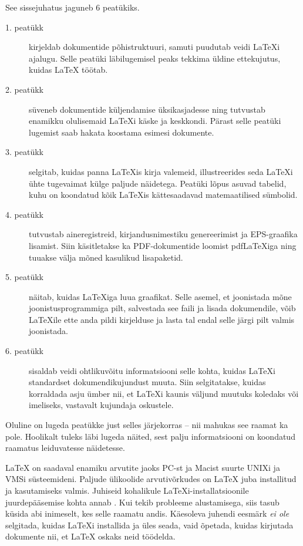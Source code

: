 \bigskip
\noindent See sissejuhatus jaguneb 6 peatükiks.
\begin{description}
\item[1. peatükk] kirjeldab \LaTeXe{} dokumentide põhistruktuuri, samuti
  puudutab veidi \LaTeX i ajalugu. Selle peatüki läbilugemisel peaks
  tekkima üldine ettekujutus, kuidas \LaTeX{} töötab.
\item[2. peatükk] süveneb dokumentide küljendamise üksikasjadesse ning
  tutvustab enamikku olulisemaid \LaTeX i käske ja keskkondi. Pärast
  selle peatüki lugemist saab hakata koostama esimesi dokumente.
\item[3. peatükk] selgitab, kuidas panna \LaTeX is kirja valemeid,
  illustreerides seda \LaTeX i ühte tugevaimat külge paljude näidetega.
  Peatüki lõpus asuvad tabelid, kuhu on koondatud kõik \LaTeX is
  kättesaadavad matemaatilised sümbolid.
\item[4. peatükk] tutvustab aineregistreid, kirjandusnimestiku
  genereerimist ja EPS-graafika lisamist. Siin käsitletakse ka
  PDF-dokumentide loomist pdf\LaTeX iga ning tuuakse välja mõned
  kasulikud lisapaketid.
\item[5. peatükk] näitab, kuidas \LaTeX iga luua graafikat. Selle
  asemel, et joonistada mõne joonistusprogrammiga pilt, salvestada see
  faili ja lisada dokumendile, võib \LaTeX ile ette anda pildi
  kirjelduse ja lasta tal endal selle järgi pilt valmis joonistada.
\item[6. peatükk] sisaldab veidi ohtlikuvõitu informatsiooni
  selle kohta, kuidas \LaTeX i standardset dokumendikujundust muuta.
  Siin selgitatakse, kuidas korraldada asju ümber nii, et
  \LaTeX i kaunis väljund muutuks koledaks või imeliseks, vastavalt
  kujundaja oskustele.
\end{description}
\bigskip
\noindent
Oluline on lugeda peatükke just selles järjekorras -- nii mahukas see
raamat ka pole. Hoolikalt tuleks läbi lugeda näited, sest palju
informatsiooni on koondatud raamatus leiduvatesse näidetesse.

\bigskip
\noindent \LaTeX{} on saadaval enamiku arvutite jaoks PC-st ja Macist
suurte UNIXi ja VMSi süsteemideni. Paljude ülikoolide arvutivõrkudes on
\LaTeX{} juba installitud ja kasutamiseks valmis. Juhiseid kohalikule
\LaTeX i-installatsioonile juurdepääsemise kohta annab \guide. Kui tekib
probleeme alustamisega, siis tasub küsida abi inimeselt, kes selle
raamatu andis. Käesoleva juhendi eesmärk \emph{ei ole} selgitada,
kuidas \LaTeX i installida ja üles seada, vaid õpetada, kuidas
kirjutada dokumente nii, et \LaTeX{} oskaks neid töödelda.

